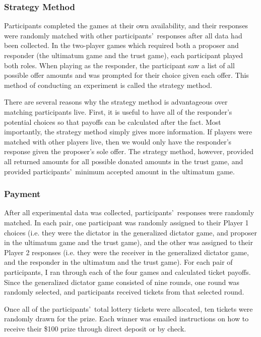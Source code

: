 \documentclass[12pt]{article}
\begin{document}
\subsubsection{Strategy Method}

Participants completed the games at their own availability, and their responses were randomly matched with other participants\rq \ responses after all data had been collected. In the two-player games which required both a proposer and responder (the ultimatum game and the trust game), each participant played both roles. When playing as the responder, the participant saw a list of all possible offer amounts and was prompted for their choice given each offer. This method of conducting an experiment is called the strategy method.

There are several reasons why the strategy method is advantageous over matching participants live. First, it is useful to have all of the responder\rq s potential choices so that payoffs can be calculated after the fact. Most importantly, the strategy method simply gives more information. If players were matched with other players live, then we would only have the responder\rq s response given the proposer\rq s sole offer. The strategy method, however, provided all returned amounts for all possible donated amounts in the trust game, and provided participants\rq \ minimum accepted amount in the ultimatum game. 

\subsubsection{Payment}

After all experimental data was collected, participants\rq \ responses were randomly matched. In each pair, one participant was randomly assigned to their Player 1 choices (i.e. they were the dictator in the generalized dictator game, and proposer in the ultimatum game and the trust game), and the other was assigned to their Player 2 responses (i.e. they were the receiver in the generalized dictator game, and the responder in the ultimatum and the trust game). For each pair of participants, I ran through each of the four games and calculated ticket payoffs. Since the generalized dictator game consisted of nine rounds, one round was randomly selected, and participants received tickets from that selected round. 

Once all of the participants\rq \ total lottery tickets were allocated, ten tickets were randomly drawn for the prize. Each winner was emailed instructions on how to receive their \$100 prize through direct deposit or by check. 
\end{document}
